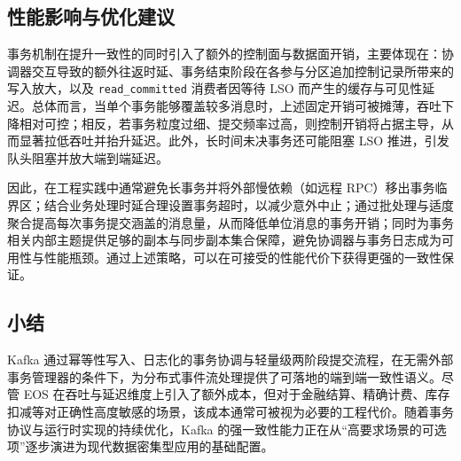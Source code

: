 \subsection{性能影响与优化建议}

事务机制在提升一致性的同时引入了额外的控制面与数据面开销，主要体现在：协调器交互导致的额外往返时延、事务结束阶段在各参与分区追加控制记录所带来的写入放大，以及 \texttt{read\_committed} 消费者因等待 LSO 而产生的缓存与可见性延迟。总体而言，当单个事务能够覆盖较多消息时，上述固定开销可被摊薄，吞吐下降相对可控；相反，若事务粒度过细、提交频率过高，则控制开销将占据主导，从而显著拉低吞吐并抬升延迟。此外，长时间未决事务还可能阻塞 LSO 推进，引发队头阻塞并放大端到端延迟。

因此，在工程实践中通常避免长事务并将外部慢依赖（如远程 RPC）移出事务临界区；结合业务处理时延合理设置事务超时，以减少意外中止；通过批处理与适度聚合提高每次事务提交涵盖的消息量，从而降低单位消息的事务开销；同时为事务相关内部主题提供足够的副本与同步副本集合保障，避免协调器与事务日志成为可用性与性能瓶颈。通过上述策略，可以在可接受的性能代价下获得更强的一致性保证。

\subsection{小结}

Kafka 通过幂等性写入、日志化的事务协调与轻量级两阶段提交流程，在无需外部事务管理器的条件下，为分布式事件流处理提供了可落地的端到端一致性语义。尽管 EOS 在吞吐与延迟维度上引入了额外成本，但对于金融结算、精确计费、库存扣减等对正确性高度敏感的场景，该成本通常可被视为必要的工程代价。随着事务协议与运行时实现的持续优化，Kafka 的强一致性能力正在从“高要求场景的可选项”逐步演进为现代数据密集型应用的基础配置。

